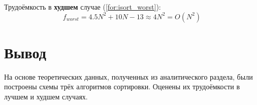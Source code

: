 Трудоёмкость в \textbf{худшем} случае (\ref{for:isort_worst}):
\begin{equation}
\label{for:isort_worst}
f_{worst} = 4.5N^2 + 10N - 13 \approx 4N^2 = O(N^{2})
\end{equation}

\clearpage
\section{Вывод}

На основе теоретических данных, полученных из аналитического раздела, были построены схемы трёх алгоритмов сортировки. Оценены их трудоёмкости в лучшем и худшем случаях.

